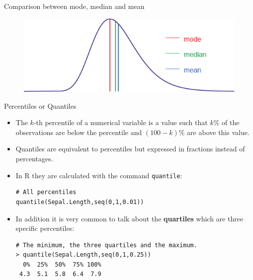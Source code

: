\documentclass[handout]{beamer}
\begin{document}
\begin{frame}{Comparison between mode, median and mean}
 
 \begin{figure}[h!]
	\centering
	\includegraphics[scale=0.5]{pics/centrales.png}
	
	
\end{figure}
 
\end{frame}







\begin{frame}[fragile]{Percentiles or Quantiles}
\scriptsize{
\begin{itemize}
 \item The $k$-th percentile of a numerical variable is a value such that $k\%$ of the observations are below the percentile and $(100-k)\%$ are above this value.
 
 \item Quantiles are equivalent to percentiles but expressed in fractions instead of percentages. 
 
 \item In R they are calculated with the command \verb+quantile+:
 \begin{verbatim}
# All percentiles
quantile(Sepal.Length,seq(0,1,0.01))
 \end{verbatim}

 
 \item In addition it is very common to talk about the \textbf{quartiles} which are three specific percentiles:
 
\begin{verbatim}
# The minimum, the three quartiles and the maximum.
> quantile(Sepal.Length,seq(0,1,0.25))
  0%  25%  50%  75% 100% 
 4.3  5.1  5.8  6.4  7.9  
\end{verbatim}

 
\end{itemize}

}

 
\end{frame}
\end{document}
